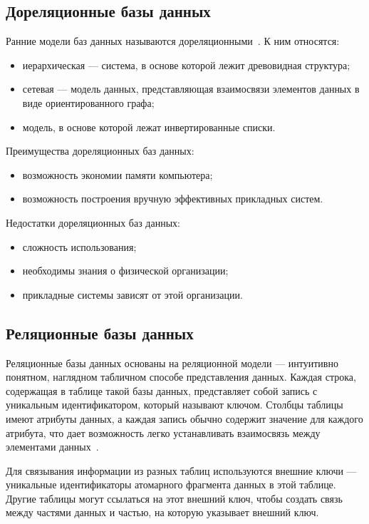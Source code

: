 \subsection{Дореляционные базы данных}
Ранние модели баз данных называются дореляционными~\cite{before}. К ним относятся:

\begin{itemize}
	\item иерархическая --- система, в основе которой лежит древовидная структура;
	\item сетевая --- модель данных, представляющая взаимосвязи элементов данных в виде ориентированного графа;
	\item модель, в основе которой лежат инвертированные списки.
\end{itemize}

Преимущества дореляционных баз данных:

\begin{itemize}
	\item возможность экономии памяти компьютера;
	\item возможность построения вручную эффективных прикладных систем.
\end{itemize}

Недостатки дореляционных баз данных:

\begin{itemize}
	\item сложность использования;
        \item необходимы знания о физической организации;
	\item прикладные системы зависят от этой организации.
\end{itemize}

\subsection{Реляционные базы данных}
 Реляционные базы данных основаны на реляционной модели — интуитивно понятном, наглядном табличном способе представления данных. Каждая строка, содержащая в таблице такой базы данных, представляет собой запись с уникальным идентификатором, который называют ключом. Столбцы таблицы имеют атрибуты данных, а каждая запись обычно содержит значение для каждого атрибута, что дает возможность легко устанавливать взаимосвязь между элементами данных~\cite{rel}.

Для связывания информации из разных таблиц используются внешние ключи --- уникальные идентификаторы атомарного фрагмента данных в этой таблице. Другие таблицы могут ссылаться на этот внешний ключ, чтобы создать связь между частями данных и частью, на которую указывает внешний ключ.

